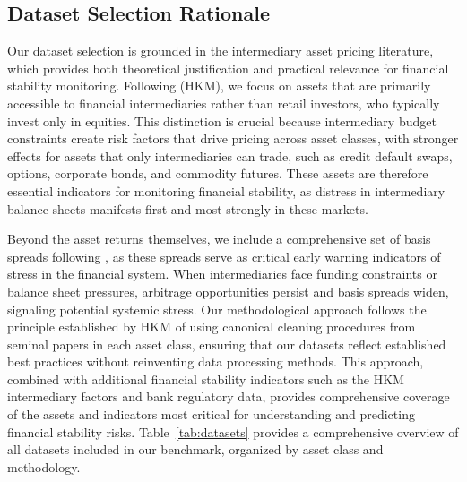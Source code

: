 \documentclass{article}
\begin{document}
\subsection{Dataset Selection Rationale}
Our dataset selection is grounded in the intermediary asset pricing literature, which provides both theoretical justification and practical relevance for financial stability monitoring. Following \citet{He2017} (HKM), we focus on assets that are primarily accessible to financial intermediaries rather than retail investors, who typically invest only in equities. This distinction is crucial because intermediary budget constraints create risk factors that drive pricing across asset classes, with stronger effects for assets that only intermediaries can trade, such as credit default swaps, options, corporate bonds, and commodity futures. These assets are therefore essential indicators for monitoring financial stability, as distress in intermediary balance sheets manifests first and most strongly in these markets.

Beyond the asset returns themselves, we include a comprehensive set of basis spreads following \citet{Siriwardane2021}, as these spreads serve as critical early warning indicators of stress in the financial system. When intermediaries face funding constraints or balance sheet pressures, arbitrage opportunities persist and basis spreads widen, signaling potential systemic stress. Our methodological approach follows the principle established by HKM of using canonical cleaning procedures from seminal papers in each asset class, ensuring that our datasets reflect established best practices without reinventing data processing methods. This approach, combined with additional financial stability indicators such as the HKM intermediary factors and bank regulatory data, provides comprehensive coverage of the assets and indicators most critical for understanding and predicting financial stability risks. Table~\ref{tab:datasets} provides a comprehensive overview of all datasets included in our benchmark, organized by asset class and methodology. 
\end{document}
